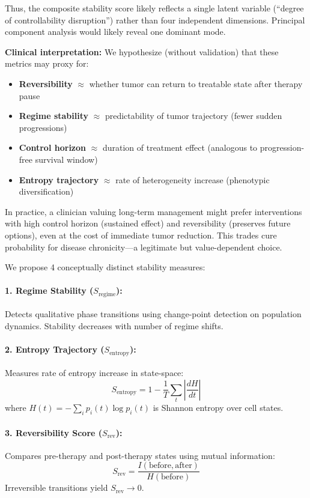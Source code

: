 \documentclass[11pt,a4paper]{article}
\begin{document}
Thus, the composite stability score likely reflects a single latent variable (``degree of controllability disruption'') rather than four independent dimensions. Principal component analysis would likely reveal one dominant mode.

\textbf{Clinical interpretation:} We hypothesize (without validation) that these metrics may proxy for:
\begin{itemize}
    \item \textbf{Reversibility} $\approx$ whether tumor can return to treatable state after therapy pause
    \item \textbf{Regime stability} $\approx$ predictability of tumor trajectory (fewer sudden progressions)
    \item \textbf{Control horizon} $\approx$ duration of treatment effect (analogous to progression-free survival window)
    \item \textbf{Entropy trajectory} $\approx$ rate of heterogeneity increase (phenotypic diversification)
\end{itemize}

In practice, a clinician valuing long-term management might prefer interventions with high control horizon (sustained effect) and reversibility (preserves future options), even at the cost of immediate tumor reduction. This trades cure probability for disease chronicity---a legitimate but value-dependent choice.

We propose 4 conceptually distinct stability measures:

\paragraph{1. Regime Stability ($S_{\text{regime}}$):}
Detects qualitative phase transitions using change-point detection on population dynamics. Stability decreases with number of regime shifts.

\paragraph{2. Entropy Trajectory ($S_{\text{entropy}}$):}
Measures rate of entropy increase in state-space:
\[
S_{\text{entropy}} = 1 - \frac{1}{T} \sum_{t} \left| \frac{dH}{dt} \right|
\]
where $H(t) = -\sum_i p_i(t) \log p_i(t)$ is Shannon entropy over cell states.

\paragraph{3. Reversibility Score ($S_{\text{rev}}$):}
Compares pre-therapy and post-therapy states using mutual information:
\[
S_{\text{rev}} = \frac{I(\text{before}, \text{after})}{H(\text{before})}
\]
Irreversible transitions yield $S_{\text{rev}} \to 0$.
\end{document}
